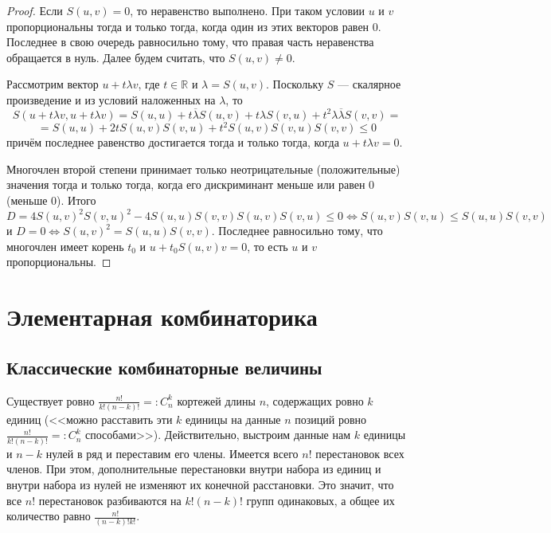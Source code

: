 \documentclass[12pt]{article}
\numberwithin{theorem}{section}
\theoremstyle{definition}
\newcommand{\RR}{\mathbb{R}}
\begin{document}
	\begin{proof}
		Если $ S(u, v) = 0 $, то неравенство выполнено. При таком условии $ u $ и $ v $ пропорциональны тогда и только тогда,
		когда один из этих векторов равен 0. Последнее в свою очередь равносильно тому, что правая часть неравенства обращается в нуль. Далее будем считать, что $ S(u,v) \neq 0 $.
		
		Рассмотрим вектор $ u + t\lambda v $, где $ t \in \RR $ и $ \lambda = S(u,v) $.
		Поскольку $ S $ --- скалярное произведение и из условий наложенных на $ 
		\lambda $, то 
		$$ S(u + t\lambda v, u + t\lambda v) 
		= S(u, u) + t\overline{\lambda}S(u, v) + t\lambda S(v, u) + t^2\lambda\overline{\lambda}S(v,v) = $$ 
		$$ = S(u,u) + 2tS(u,v)S(v,u) + t^2S(u,v)S(v,u)S(v,v) \leqslant 0 $$
		причём последнее равенство достигается тогда и только тогда, когда $ u + t\lambda v = 0 $.
		
		Многочлен второй степени принимает только неотрицательные (положительные) значения тогда и только тогда, когда его дискриминант меньше или равен 0 (меньше 0).
		Итого $$ D = 4S(u,v)^2S(v,u)^2 - 4S(u,u)S(v,v)S(u,v)S(v,u) \leqslant 0  \Leftrightarrow S(u,v)S(v,u) \leqslant S(u,u)S(v,v) $$
		и $ D = 0 \Leftrightarrow S(u,v)^2 = S(u,u)S(v,v) $. Последнее равносильно тому, что многочлен имеет корень $ t_0 $
		и $ u + t_0S(u, v)v = 0 $, то есть $ u $ и $ v $ пропорциональны.
	\end{proof}
	
	\section{Элементарная комбинаторика}
	
	\subsection{Классические комбинаторные величины}
	
	Существует ровно $ \tfrac{n!}{k!(n - k)!} =: C_n^k $ кортежей длины $ n $, содержащих ровно $ k $ единиц (<<можно расставить эти $ k $ единицы на данные $ n $ позиций ровно $ \tfrac{n!}{k!(n - k)!} =: C_n^k $ способами>>).
	Действительно, выстроим данные нам $ k $ единицы и $ n - k $ нулей в ряд и переставим его члены.
	Имеется всего $ n! $ перестановок всех членов. При этом, дополнительные перестановки внутри набора из единиц
	и внутри набора из нулей не изменяют их конечной расстановки. Это значит, что все $ n! $ перестановок
	разбиваются на $ k!(n - k)! $ групп одинаковых, а общее их количество равно $ \tfrac{n!}{(n - k)!k!} $.
	
\end{document}
